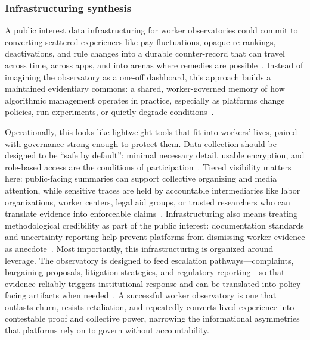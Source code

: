 \documentclass[acmsmall,screen]{acmart}
\begin{document}
\subsubsection*{Infrastructuring synthesis}
A public interest data infrastructuring for worker observatories could commit to converting scattered experiences like pay fluctuations, opaque re-rankings, deactivations, and rule changes into a durable counter-record that can travel across time, across apps, and into arenas where remedies are possible~\cite{calacciOrganizingEndEmployment2022,steinYouAreYou2023}. Instead of imagining the observatory as a one-off dashboard, this approach builds a maintained evidentiary commons: a shared, worker-governed memory of how algorithmic management operates in practice, especially as platforms change policies, run experiments, or quietly degrade conditions~\cite{binnsNotEvenNice2025}.

Operationally, this looks like lightweight tools that fit into workers’ lives, paired with governance strong enough to protect them. Data collection should be designed to be ``safe by default'': minimal necessary detail, usable encryption, and role-based access are the conditions of participation~\cite{hernandezEndDayAm2024,doDesigningGigWorker2024}. Tiered visibility matters here: public-facing summaries can support collective organizing and media attention, while sensitive traces are held by accountable intermediaries like labor organizations, worker centers, legal aid groups, or trusted researchers who can translate evidence into enforceable claims~\cite{calacciAccessUnderstandingCollective2023,vincentDataLeverageFramework2021a}. Infrastructuring also means treating methodological credibility as part of the public interest: documentation standards and uncertainty reporting help prevent platforms from dismissing worker evidence as anecdote~\cite{dalalLessonsWorkersInquiry2024}. Most importantly, this infrastructuring is organized around leverage. The observatory is designed to feed escalation pathways—complaints, bargaining proposals, litigation strategies, and regulatory reporting—so that evidence reliably triggers institutional response and can be translated into policy-facing artifacts when needed~\cite{nagarajraoRideshareTransparencyTranslating2025,zhangDataProbesBoundary2024}. A successful worker observatory is one that outlasts churn, resists retaliation, and repeatedly converts lived experience into contestable proof and collective power, narrowing the informational asymmetries that platforms rely on to govern without accountability.
\end{document}
